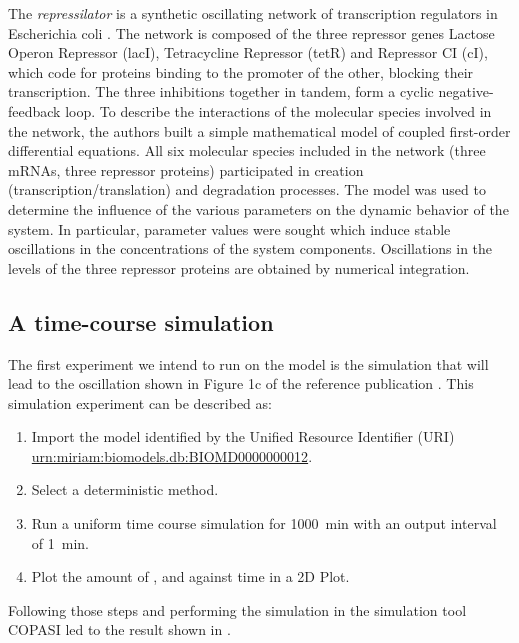 The \emph{repressilator} is a synthetic oscillating network of transcription regulators in Escherichia coli \citep{Elowitz:2000}. The network is composed of the three repressor genes Lactose Operon Repressor (lacI), Tetracycline Repressor (tetR) and Repressor CI (cI), which code for proteins binding to the promoter of the other, blocking their transcription. The three inhibitions together in tandem, form a cyclic negative-feedback loop. To describe the interactions of the molecular species involved in the network, the authors built a simple mathematical model of coupled first-order differential equations. All six molecular species included in the network (three mRNAs, three repressor proteins) participated in creation (transcription/translation) and degradation processes. The model was used to determine the influence of the various parameters on the dynamic behavior of the system. In particular, parameter values were sought which induce stable oscillations in the concentrations of the system components. Oscillations in the levels of the three repressor proteins are obtained by numerical integration. 

\subsection{A time-course simulation}
\label{sec:intro1}
The first experiment we intend to run on the model is the simulation that will lead to the oscillation shown in Figure 1c of the reference publication \citep{Elowitz:2000}. This simulation experiment can be described as:

\begin{enumerate}
 	\item{Import the model identified by the Unified Resource Identifier (URI) \citep{Berners-Lee:2005} \url{urn:miriam:biomodels.db:BIOMD0000000012}.}
 	\item {Select a deterministic method.}
 	\item{Run a uniform time course simulation for 1000~min with an output interval of 1~min.}
 	\item{Plot the amount of ,  and  against time in a 2D Plot.}
 \end{enumerate}

Following those steps and performing the simulation in the simulation tool COPASI \citep{Hoops:2006} led to the result shown in . 

